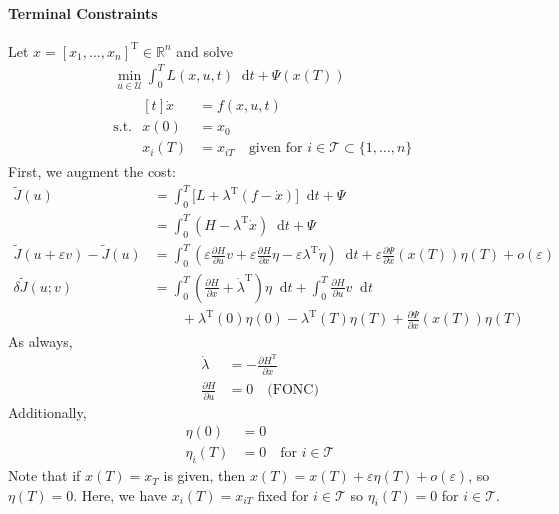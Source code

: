 \documentclass[letterpaper,12pt,titlepage]{report}
\newcommand*\dif{\mathop{}\!\mathrm{d}}
\newcommand{\trans}{^\text{T}}
\newcommand*\pder[2]{\frac{\partial #1}{\partial #2}}
\newcommand*\R{\mathbb{R}}
\theoremstyle{plain}
\theoremstyle{definition}
\begin{document}
\paragraph{Terminal Constraints} \mbox{}
\hypertarget{fixed_term_cons}{}

Let $x=[x_1,\dots,x_n]\trans\in\R^n$ and solve
\begin{align}
  & \min_{u\in\mathcal U} \int_0^T L(x,u,t)\dif t + \Psi(x(T)) \\
  & \text{s.t. } \begin{aligned}[t]
    \dot x &= f(x,u,t) \\
    x(0) &= x_0 \\
    x_i(T) &= x_{iT} \quad \text{given for } i\in\mathcal T \subset \{1,\dots,n\}
  \end{aligned}
\end{align}
First, we augment the cost:
\begin{align}
  \tilde J(u) &= \int_0^T \big[ L + \lambda\trans (f-\dot x) \big] \dif t + \Psi \\
              &= \int_0^T (H-\lambda\trans\dot x) \dif t + \Psi \\
  \tilde J (u+\varepsilon v) - \tilde J(u) &= \int_0^T \left( \varepsilon\pder{H}{u} v + \varepsilon\pder{H}{x}\eta - \varepsilon\lambda\trans\dot\eta \right) \dif t + \varepsilon\pder{\Psi}{x}(x(T))\eta(T) + o(\varepsilon) \\
  \delta\tilde J(u;v) &= \int_0^T \left( \pder{H}{x} + \dot\lambda\trans \right)\eta\dif t + \int_0^T \pder{H}{u}v\dif t \\
              & \qquad + \lambda\trans(0)\eta(0) - \lambda\trans(T)\eta(T) + \pder{\Psi}{x}(x(T))\eta(T)
\end{align}
As always,
\begin{align}
  \dot\lambda &= -\pder{H\trans}{x} \\
  \pder{H}{u} &= 0 \quad \text{(FONC)}
\end{align}
Additionally,
\begin{align}
  \eta(0) &= 0 \\
  \eta_i(T) &= 0 \quad \text{for } i\in\mathcal T
\end{align}
Note that if $x(T)=x_T$ is given, then $x(T)=x(T)+\varepsilon\eta(T)+o(\varepsilon)$, so $\eta(T)=0$. Here, we have $x_i(T)=x_{iT}$ fixed for $i\in\mathcal T$ so $\eta_i(T)=0$ for $i\in\mathcal T$.
\end{document}
